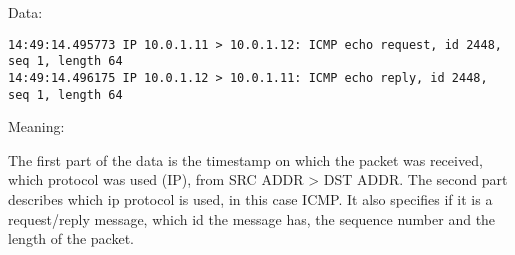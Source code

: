 \newline Data:
\begin{lstlisting}
14:49:14.495773 IP 10.0.1.11 > 10.0.1.12: ICMP echo request, id 2448, seq 1, length 64
14:49:14.496175 IP 10.0.1.12 > 10.0.1.11: ICMP echo reply, id 2448, seq 1, length 64
\end{lstlisting}
Meaning: 

The first part of the data is the timestamp on which the packet was received, which protocol was used (IP), from SRC ADDR > DST ADDR. The second part describes which ip protocol is used, in this case ICMP. It also specifies if it is a request/reply message, which id the message has, the sequence number and the length of the packet.